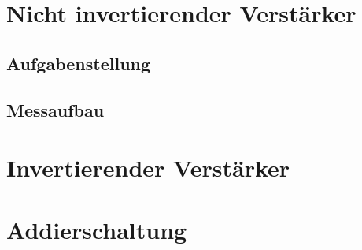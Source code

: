\section{Nicht invertierender Verstärker}
\subsection{Aufgabenstellung}


\subsection{Messaufbau}



\section{Invertierender Verstärker}




\section{Addierschaltung}

